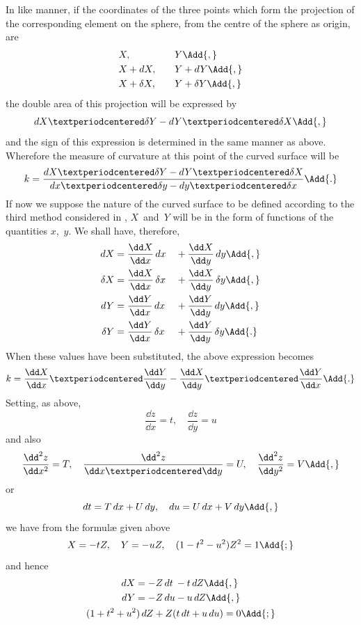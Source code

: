 In like manner, if the coordinates of the three points which form the projection of
the corresponding element on the sphere, from the centre of the sphere as origin, are
\begin{alignat*}{3}
&X,           && Y\Add{,} \\
&X + dX,\quad && Y + dY\Add{,} \\
&X + \delta X,\quad && Y + \delta Y\Add{,}
\end{alignat*}
the double area of this projection will be expressed by
\[
dX·\delta Y - dY·\delta X\Add{,}
\]
and the sign of this expression is determined in the same manner as above. Wherefore
the measure of curvature at this point of the curved surface will be
\[
k = \frac{dX·\delta Y - dY·\delta X}{dx·\delta y - dy·\delta x}\Add{.}
\]
If now we suppose the nature of the curved surface to be defined according to the third
method considered in , $X$~and~$Y$ will be in the form of functions of the quantities
$x$,~$y$. We shall have, therefore,
\begin{alignat*}{2}
dX &= \frac{\dd X}{\dd x}\, dx &&+ \frac{\dd X}{\dd y}\, dy\Add{,} \\
\delta X &= \frac{\dd X}{\dd x}\, \delta x
          &&+ \frac{\dd X}{\dd y}\, \delta y\Add{,} \\
dY &= \frac{\dd Y}{\dd x}\, dx &&+ \frac{\dd Y}{\dd y}\, dy\Add{,} \\
\delta Y &= \frac{\dd Y}{\dd x}\, \delta x
          &&+ \frac{\dd Y}{\dd y}\, \delta y\Add{.}
\end{alignat*}
When these values have been substituted, the above expression becomes
\[
k = \frac{\dd X}{\dd x}·\frac{\dd Y}{\dd y}
  - \frac{\dd X}{\dd y}·\frac{\dd Y}{\dd x}\Add{.}
\]
Setting, as above,
\[
\frac{\dd z}{\dd x} = t,\quad \frac{\dd z}{\dd y} = u
\]
and also
\[
\frac{\dd^{2} z}{\dd x^{2}} = T,\quad
\frac{\dd^{2} z}{\dd x·\dd y} = U,\quad
\frac{\dd^{2} z}{\dd y^{2}} = V\Add{,}
\]
or
\[
dt = T\, dx + U\, dy,\quad
du = U\, dx + V\, dy\Add{,}
\]
we have from the formulæ given above
\[
X = -tZ,\quad Y = -uZ,\quad (1 - t^{2} - u^{2})Z^{2} = 1\Add{;}
\]
and hence
\begin{gather*}
\begin{alignedat}{2}
dX &= -Z\, dt &&- t\, dZ\Add{,} \\
dY &= -Z\, du &&- u\, dZ\Add{,}
\end{alignedat} \\
(1 + t^{2} + u^{2})\, dZ + Z(t\, dt + u\, du) = 0\Add{;}
\end{gather*}
